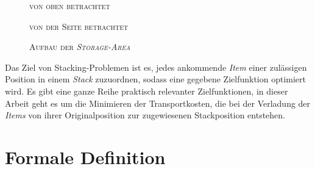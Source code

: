 \begin{figure}[H]
\centering
{}
\caption*{\textsc{von oben betrachtet}}
\end{figure}
\begin{figure}[H]
\centering
{}
\caption*{\textsc{von der Seite betrachtet}}

\caption{\textsc{Aufbau der \textit{Storage-Area}}}
\label{fig:storage_area}
\end{figure}

Das Ziel von Stacking-Problemen ist es, jedes ankommende \textit{Item} einer zulässigen Position in einem
\textit{Stack} zuzuordnen, sodass eine gegebene Zielfunktion optimiert wird. Es gibt eine ganze Reihe praktisch relevanter Zielfunktionen,
in dieser Arbeit geht es um die Minimieren der Transportkosten, die bei der Verladung der \textit{Items} von ihrer Originalposition zur zugewiesenen Stackposition entstehen.

\pagebreak

\section{Formale Definition}
\label{sec:formal_definition}

